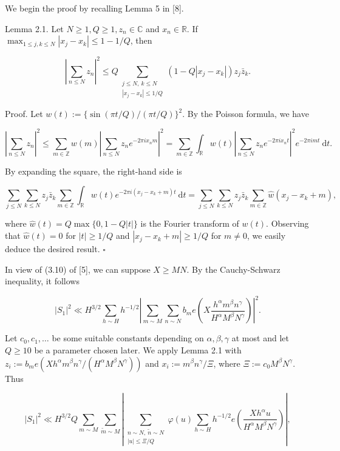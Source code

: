 \documentclass[10pt]{article}
\begin{document}
We begin the proof by recalling Lemma 5 in [8].

Lemma 2.1. Let $N \geqslant 1, Q \geqslant 1, z_{n} \in \mathbb{C}$ and $x_{n} \in \mathbb{R}$. If $\max_{1\leqslant j,k\leqslant N}|x_j-x_k|\leqslant 1-1/Q$, then

$$
\left|\sum_{n \leqslant N} z_{n}\right|^{2}
\leqslant Q\sum_{\substack{j\leqslant N,\ k\leqslant N\\ |x_j-x_k|\leqslant 1/Q}}
\left(1-Q|x_j-x_k|\right)z_j\bar z_k.
$$

Proof. Let $w(t):=\{\sin (\pi t / Q) /(\pi t / Q)\}^{2}$. By the Poisson formula, we have

$$
\left|\sum_{n \leqslant N} z_{n}\right|^{2} \leqslant \sum_{m \in \mathbb{Z}} w(m)\left|\sum_{n \leqslant N} z_{n} e^{-2 \pi i x_{n} m}\right|^{2}=\sum_{m \in \mathbb{Z}} \int_{\mathbb{R}} w(t)\left|\sum_{n \leqslant N} z_{n} e^{-2 \pi i x_{n} t}\right|^{2} e^{-2 \pi i m t} \mathrm{~d} t .
$$

By expanding the square, the right-hand side is

$$
\sum_{j \leqslant N} \sum_{k \leqslant N} z_{j} \bar{z}_{k} \sum_{m \in \mathbb{Z}} \int_{\mathbb{R}} w(t) e^{-2 \pi i\left(x_{j}-x_{k}+m\right) t} \mathrm{~d} t=\sum_{j \leqslant N} \sum_{k \leqslant N} z_{j} \bar{z}_{k} \sum_{m \in \mathbb{Z}} \hat{w}\left(x_{j}-x_{k}+m\right),
$$

where $\hat{w}(t)=Q \max \{0,1-Q|t|\}$ is the Fourier transform of $w(t)$. Observing that $\hat{w}(t)=0$ for $|t| \geqslant 1 / Q$ and $\left|x_{j}-x_{k}+m\right| \geqslant 1 / Q$ for $m \neq 0$, we easily deduce the desired result. \(\square\)

In view of (3.10) of [5], we can suppose $X \geqslant M N$. By the Cauchy-Schwarz inequality, it follows

$$
|S_{1}|^{2} \ll H^{3 / 2} \sum_{h \sim H} h^{-1 / 2}\left|\sum_{m \sim M} \sum_{n \sim N} b_{m} e\left(X \frac{h^{\alpha} m^{\beta} n^{\gamma}}{H^{\alpha} M^{\beta} N^{\gamma}}\right)\right|^{2} .
$$

Let $c_{0}, c_{1}, \ldots$ be some suitable constants depending on $\alpha, \beta, \gamma$ at most and let $Q \geqslant 10$ be a parameter chosen later. We apply Lemma 2.1 with $z_i:=b_m e\left(Xh^{\alpha}m^{\beta}n^{\gamma}/(H^{\alpha}M^{\beta}N^{\gamma})\right)$ and $x_i:=m^{\beta}n^{\gamma}/\Xi$, where $\Xi:=c_{0} M^{\beta} N^{\gamma}$. Thus

$$
|S_{1}|^{2} \ll H^{3/2}Q\sum_{m\sim M}\sum_{\tilde m\sim M}
\left|\sum_{\substack{n\sim N,\ \tilde n\sim N\\ |u|\leqslant \Xi/Q}}
\varphi(u)\sum_{h\sim H}h^{-1/2}
 e\left(\frac{Xh^{\alpha}u}{H^{\alpha}M^{\beta}N^{\gamma}}\right)\right|,
$$
\end{document}
